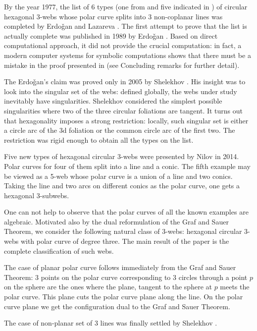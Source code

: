 \documentclass[11pt,a4paper]{article}
\begin{document}
By the year 1977, the list of 6 types (one from \cite{BB-38} and five indicated in \cite{W-38}) of circular hexagonal 3-webs whose polar curve splits into 3 non-coplanar lines was completed by Erdo\v{g}an  \cite{E-74} and  Lazareva \cite{L-77}.  The first attempt  to prove that the list is actually complete was published in 1989 by Erdo\v{g}an \cite{E-89}. Based on direct computational  approach, it did not  provide  the crucial computation: in fact, a modern computer systems for symbolic computations shows that there must be a mistake in the proof presented in \cite{E-89} (see Concluding remarks for further detail). 

The Erdo\v{g}an's claim was proved only in 2005 by Shelekhov \cite{S-05}. His insight was to look into the singular set of the webs: defined globally, the webs under study inevitably have singularities. Shelekhov considered the simplest possible singularities where two of the three circular foliations are tangent. It turns out that hexagonality imposes a strong restriction:  locally, such singular set is either a circle arc of the 3d foliation or the common circle arc of the first two. The restriction was rigid enough to obtain all the types on the list.

Five new types of hexagonal circular 3-webs were presented by Nilov  \cite{N-14} in 2014. Polar curves for four of them split into a  line and a conic. The fifth example may be viewed as a 5-web whose polar curve is a union of a line and two conics. Taking the line and two arcs on different conics as the polar curve, one gets a hexagonal 3-subwebs.  

One can not help to observe that the polar curves of all the known examples are algebraic.  Motivated also by the dual reformulation of the Graf and Sauer Theorem, we consider the following natural class of 3-webs: hexagonal circular 3-webs with polar curve of degree three. The main result of the paper is the complete classification of such webs. 

The case of planar polar curve follows immediately from the Graf and Sauer Theorem: 3 points on the polar curve corresponding to 3 circles through a point $p$ on the sphere are the ones where the plane, tangent to the sphere at $p$ meets the polar curve. This plane cuts  the polar curve plane along the line. On the polar curve plane we get the configuration dual to the Graf and Sauer Theorem. 

The case of non-planar set of 3 lines was finally settled by Shelekhov \cite{S-05}.  
\end{document}
